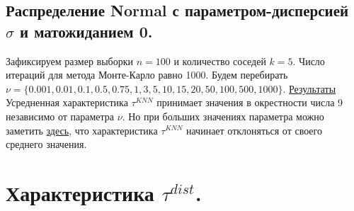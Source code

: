 \documentclass{report}
\begin{document}
\subsection{Распределение Normal с параметром-дисперсией $\sigma$ и матожиданием 0.}
Зафиксируем размер выборки $n = 100$ и количество соседей $k = 5$. Число итераций для метода Монте-Карло равно 1000.
\newline
\newline
Будем перебирать $\nu = \{0.001, 0.01, 0.1, 0.5, 0.75, 1, 3, 5, 10, 15, 20, 50, 100, 500, 1000\}$.
\newline
\newline
\href{https://github.com/misshimichka/dm-random-graphs/blob/dmitrii/report/report/fix_construct_norm_max_deg_knn.png}{Результаты}
\newline
\newline
Усредненная характеристика $\tau^{KNN}$ принимает значения в окрестности числа 9 независимо от параметра $\nu$. Но при больших значениях параметра можно заметить \href{https://github.com/misshimichka/dm-random-graphs/blob/dmitrii/report/report/fix_construct_norm_sigma2avg_max_deg_knn.png}{здесь}, что характеристика $\tau^{KNN}$ начинает отклоняться от своего среднего значения.

\section{Характеристика $\tau^{dist}$.}
\end{document}

